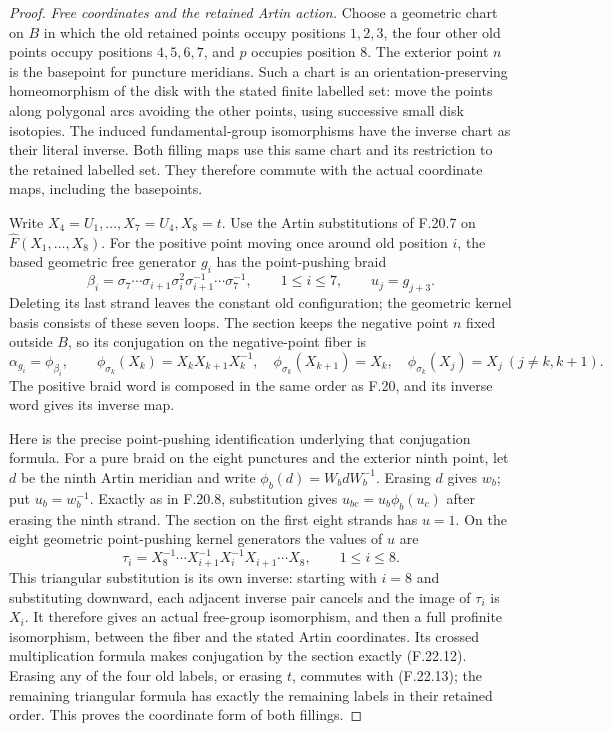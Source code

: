 \begin{proof}
\emph{Free coordinates and the retained Artin action.}
Choose a geometric chart on $B$ in which the old
retained points occupy positions $1,2,3$, the four
other old points occupy positions $4,5,6,7$, and $p$
occupies position $8$. The exterior point $n$ is
the basepoint for puncture meridians. Such a chart
is an orientation-preserving homeomorphism of the
disk with the stated finite labelled set: move
the points along polygonal arcs avoiding the other
points, using successive small disk isotopies.
The induced fundamental-group isomorphisms have
the inverse chart as their literal inverse.
Both filling maps use this same chart and its
restriction to the retained labelled set.
They therefore commute with the actual coordinate
maps, including the basepoints.

Write $X_4=U_1,\ldots,X_7=U_4,X_8=t$.
Use the Artin substitutions of F.20.7 on
$\widehat F(X_1,\ldots,X_8)$.
For the positive point moving once around old
position $i$, the based geometric free generator
$g_i$ has the point-pushing braid
\[
 \beta_i=\sigma_7\cdots\sigma_{i+1}\sigma_i^2
                  \sigma_{i+1}^{-1}\cdots\sigma_7^{-1},
          \qquad1\leq i\leq7,
 \qquad u_j=g_{j+3}.
                                                               \tag{F.22.11}
\]
Deleting its last strand leaves the constant old
configuration; the geometric kernel basis consists
of these seven loops. The section keeps the negative
point $n$ fixed outside $B$, so its conjugation on
the negative-point fiber is
\[
 \alpha_{g_i}=\phi_{\beta_i},
 \qquad
 \phi_{\sigma_k}(X_k)=X_kX_{k+1}X_k^{-1},
 \quad\phi_{\sigma_k}(X_{k+1})=X_k,
 \quad\phi_{\sigma_k}(X_j)=X_j\ (j\ne k,k+1).
                                                               \tag{F.22.12}
\]
The positive braid word is composed in the same order
as F.20, and its inverse word gives its inverse map.

Here is the precise point-pushing identification
underlying that conjugation formula. For a pure
braid on the eight punctures and the exterior ninth
point, let $d$ be the ninth Artin meridian and write
$\phi_b(d)=W_bdW_b^{-1}$. Erasing $d$ gives $w_b$;
put $u_b=w_b^{-1}$. Exactly as in F.20.8, substitution
gives $u_{bc}=u_b\phi_b(u_c)$ after erasing the ninth
strand. The section on the first eight strands has
$u=1$. On the eight geometric point-pushing kernel
generators the values of $u$ are
\[
       \tau_i=X_8^{-1}\cdots X_{i+1}^{-1}
                    X_i^{-1}X_{i+1}\cdots X_8,
                \qquad1\leq i\leq8.
                                                               \tag{F.22.13}
\]
This triangular substitution is its own inverse:
starting with $i=8$ and substituting downward,
each adjacent inverse pair cancels and the image
of $\tau_i$ is $X_i$. It therefore gives an actual
free-group isomorphism, and then a full profinite
isomorphism, between the fiber and the stated
Artin coordinates. Its crossed multiplication
formula makes conjugation by the section exactly
(F.22.12). Erasing any of the four old labels,
or erasing $t$, commutes with (F.22.13); the
remaining triangular formula has exactly the
remaining labels in their retained order.
This proves the coordinate form of both fillings.


\end{proof}
